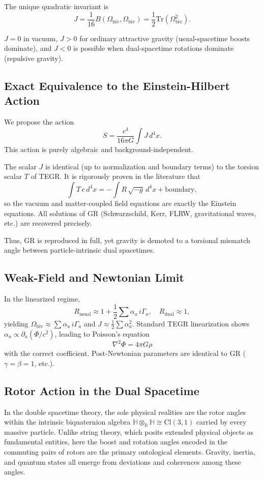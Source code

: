 \documentclass[dvipdfmx,a4paper]{article}
\begin{document}
The unique quadratic invariant is
\[
J = \frac{1}{16} B(\Omega_\text{biv}, \Omega_\text{biv}) = \frac{1}{2} \mathrm{Tr}(\Omega_\text{biv}^2).
\]

$J = 0$ in vacuum, $J > 0$ for ordinary attractive gravity (usual-spacetime boosts dominate), and $J < 0$ is possible when dual-spacetime rotations dominate (repulsive gravity).

\subsection{Exact Equivalence to the Einstein-Hilbert Action}

We propose the action
\[
S = \frac{c^4}{16\pi G} \int J \, d^4x.
\]
This action is purely algebraic and background-independent.

The scalar $J$ is identical (up to normalization and boundary terms) to the torsion scalar $T$ of TEGR. It is rigorously proven in the literature that
\[
\int T \, e \, d^4x = -\int R \, \sqrt{-g} \, d^4x + \mathrm{boundary},
\]
so the vacuum and matter-coupled field equations are exactly the Einstein equations. All solutions of GR (Schwarzschild, Kerr, FLRW, gravitational waves, etc.) are recovered precisely.

Thus, GR is reproduced in full, yet gravity is demoted to a torsional mismatch angle between particle-intrinsic dual spacetimes.

\subsection{Weak-Field and Newtonian Limit}

In the linearized regime,
\[
R_\text{usual} \approx 1 + \frac{1}{2} \sum \alpha_a \, i\Gamma_a, \quad R_\text{dual} \approx 1,
\]
yielding $\Omega_\text{biv} \approx \sum \alpha_a \, i\Gamma_a$ and $J \approx \frac{1}{2} \sum \alpha_a^2$. Standard TEGR linearization shows $\alpha_a \propto \partial_a (\Phi/c^2)$, leading to Poisson's equation
\[
\nabla^2 \Phi = 4\pi G \rho
\]
with the correct coefficient. Post-Newtonian parameters are identical to GR ($\gamma = \beta = 1$, etc.).

\subsection{Rotor Action in the Dual Spacetime}
\label{subsec:dual-rotors}

In the double spacetime theory, the sole physical realities are the rotor angles within the intrinsic biquaternion algebra $\mathbb{H} \otimes_{\mathbb{R}} \mathbb{H} \cong \mathrm{Cl}(3,1)$ carried by every massive particle. Unlike string theory, which posits extended physical objects as fundamental entities, here the boost and rotation angles encoded in the commuting pairs of rotors are the primary ontological elements. Gravity, inertia, and quantum states all emerge from deviations and coherences among these angles.
\end{document}
